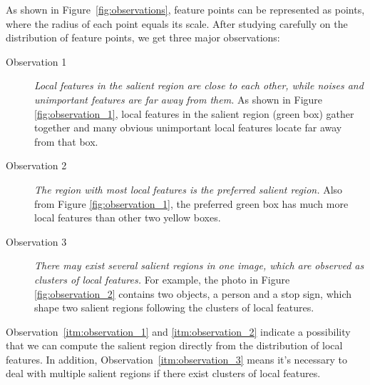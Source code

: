 As shown in Figure~\ref{fig:observations}, feature points can be represented as points, where the radius of each point equals its scale. After studying carefully on the distribution of feature points, we get three major observations:

\begin{description}
	
	\item[Observation 1]  \textit{Local features in the salient region are close to each other, while noises and unimportant features are far away from them.} As shown in Figure \ref{fig:observation_1}, local features in the salient region (green box) gather together and many obvious unimportant local features locate far away from that box. 

	\item[Observation 2]  \textit{The region with most local features is the preferred salient region.} Also from Figure \ref{fig:observation_1}, the preferred green box has much more local features than other two yellow boxes. 

	\item[Observation 3]  \textit{There may exist several salient regions in one image, which are observed as clusters of local features.} For example, the photo in Figure \ref{fig:observation_2} contains two objects, a person and a stop sign, which shape two salient regions following the clusters of local features.

\end{description}

Observation~\ref{itm:observation_1} and \ref{itm:observation_2} indicate a possibility that we can compute the salient region directly from the distribution of local features. In addition, Observation~\ref{itm:observation_3} means it's necessary to deal with multiple salient regions if there exist clusters of local features.

